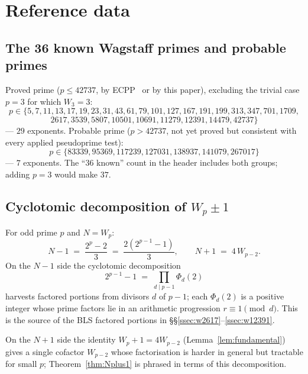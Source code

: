 \documentclass[11pt,a4paper]{amsart}
\theoremstyle{plain}
\theoremstyle{definition}
\begin{document}
\appendix

\section{Reference data}
\label{sec:appendix}

\subsection{The 36 known Wagstaff primes and probable primes}

Proved prime ($p \leq 42737$, by ECPP~\cite{AtkinMorain} or by this
paper), excluding the trivial case $p = 3$ for which $W_3 = 3$:
\[
  p \in \{5, 7, 11, 13, 17, 19, 23, 31, 43, 61, 79, 101, 127, 167,
  191, 199, 313, 347, 701, 1709,
\]
\[
  2617, 3539, 5807, 10501, 10691, 11279, 12391, 14479, 42737\}
\]
--- $29$ exponents. Probable prime ($p > 42737$, not yet proved but
consistent with every applied pseudoprime test):
\[
  p \in \{83339, 95369, 117239, 127031, 138937, 141079, 267017\}
\]
--- $7$ exponents. The ``$36$ known'' count in the header includes both
groups; adding $p = 3$ would make $37$.

\subsection{Cyclotomic decomposition of $W_p \pm 1$}

For odd prime $p$ and $N = W_p$:
\[
  N - 1 \;=\; \frac{2^p - 2}{3} \;=\; \frac{2(2^{p-1} - 1)}{3},
  \qquad N + 1 \;=\; 4\, W_{p-2}.
\]
On the $N - 1$ side the cyclotomic decomposition
\[
  2^{p-1} - 1 \;=\; \prod_{d \mid p-1} \Phi_d(2)
\]
harvests factored portions from divisors $d$ of $p - 1$; each
$\Phi_d(2)$ is a positive integer whose prime factors lie in an
arithmetic progression $r \equiv 1 \pmod d$. This is the source of
the BLS factored portions in
\S\S\ref{ssec:w2617}--\ref{ssec:w12391}.

On the $N + 1$ side the identity $W_p + 1 = 4 W_{p-2}$
(Lemma~\ref{lem:fundamental}) gives a single cofactor $W_{p-2}$ whose
factorisation is harder in general but tractable for small $p$;
Theorem~\ref{thm:Nplus1} is phrased in terms of this decomposition.
\end{document}
